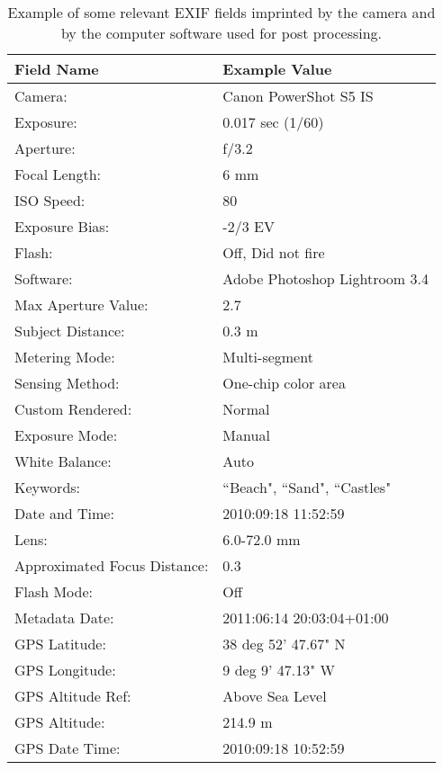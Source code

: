 \begin{table}[h]
\vspace{\baselineskip}
\renewcommand{\arraystretch}{1.4}
\centering
\vspace{0.2cm}
	\begin{tabular}{ll}
	\textbf{Field Name}			&	\textbf{Example Value}\\
	\hline
	Camera:				&	Canon PowerShot S5 IS\\
	Exposure:			&	0.017 sec (1/60)\\
	Aperture:			&	f/3.2\\
	Focal Length:		&	6 mm\\
	ISO Speed:			&	80\\
	Exposure Bias:		&	-2/3 EV\\
	Flash:				&	Off, Did not fire\\
	Software:			&	Adobe Photoshop Lightroom 3.4\\
	Max Aperture Value:	&	2.7\\
	Subject Distance:	&	0.3 m\\
	Metering Mode:		&	Multi-segment\\
	Sensing Method:		&	One-chip color area\\
	Custom Rendered:	&	Normal\\
	Exposure Mode:		&	Manual\\
	White Balance:		&	Auto\\
	Keywords:			&	``Beach", ``Sand", ``Castles"\\
	Date and Time:		&	2010:09:18 11:52:59\\
	Lens:				&	6.0-72.0 mm\\
	Approximated Focus Distance:	&	0.3\\
	Flash Mode:			&	Off\\
	Metadata Date:		&	2011:06:14 20:03:04+01:00\\
	GPS Latitude: 		&	38 deg 52' 47.67" N\\
	GPS Longitude: 		&	9 deg 9' 47.13" W\\
	GPS Altitude Ref: 	&	Above Sea Level\\
	GPS Altitude: 		&	214.9 m\\
	GPS Date Time:		&	2010:09:18 10:52:59\\
\end{tabular}
\caption{Example of some relevant EXIF fields imprinted by the camera and by the computer software used for post processing.}
\label{tab:exif}
\end{table}




